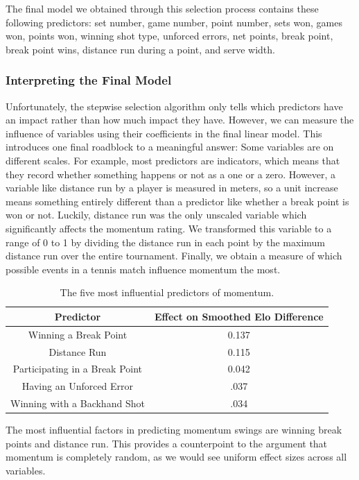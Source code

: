 \documentclass[letterpaper, 12pt]{article}
\begin{document}
        The final model we obtained through this selection process contains these following predictors: set number, game number, point number, sets won, games won, points won, winning shot type, unforced errors, net points, break point, break point wins, distance run during a point, and serve width.

        \subsubsection{Interpreting the Final Model}
        Unfortunately, the stepwise selection algorithm only tells which predictors have an impact rather than how much impact they have. However, we can measure the influence of variables using their coefficients in the final linear model. This introduces one final roadblock to a meaningful answer: Some variables are on different scales. For example, most predictors are indicators, which means that they record whether something happens or not as a one or a zero. However, a variable like distance run by a player is measured in meters, so a unit increase means something entirely different than a predictor like whether a break point is won or not. Luckily, distance run was the only unscaled variable which significantly affects the momentum rating. We transformed this variable to a range of 0 to 1 by dividing the distance run in each point by the maximum distance run over the entire tournament. Finally, we obtain a measure of which possible events in a tennis match influence momentum the most.

        \begin{table}[]
            \centering
            \begin{tabular}{c|c}
                Predictor & Effect on Smoothed Elo Difference \\ \hline
                Winning a Break Point &  0.137\\
                Distance Run & 0.115 \\
                Participating in a Break Point & 0.042 \\
                Having an Unforced Error & .037 \\
                Winning with a Backhand Shot & .034
            \end{tabular}
            \caption{The five most influential predictors of momentum.}
            \label{tab:my_label}
        \end{table}

        The most influential factors in predicting momentum swings are winning break points and distance run. This provides a counterpoint to the argument that momentum is completely random, as we would see uniform effect sizes across all variables.
\end{document}
